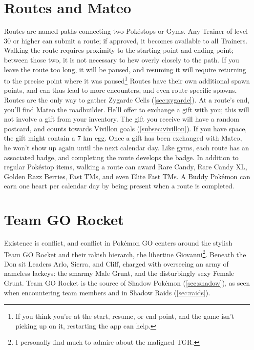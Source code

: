\section{Routes and Mateo\label{sec:routes}}
Routes are named paths connecting two Pokéstops or Gyms.
Any Trainer of level 30 or higher can submit a route; if approved, it becomes available to all Trainers.
Walking the route requires proximity to the starting point and ending point; between those two,
 it is not necessary to hew overly closely to the path.
If you leave the route too long, it will be paused, and resuming it will require returning to the precise
 point where it was paused\footnote{If you think you're at the start, resume, or end point, and the game isn't picking
 up on it, restarting the app can help.}
Routes have their own additional spawn points, and can thus lead to more encounters, and even route-specific spawns.
Routes are the only way to gather Zygarde Cells (\autoref{sec:zygarde}).
At a route's end, you'll find Mateo the roadbuilder.
He'll offer to exchange a gift with you; this will not involve a gift from your inventory.
The gift you receive will have a random postcard, and counts towards Vivillon goals (\autoref{subsec:vivillon}).
If you have space, the gift might contain a 7 km egg.
Once a gift has been exchanged with Mateo, he won't show up again until the next calendar day.
Like gyms, each route has an associated badge, and completing the route develops the badge.
In addition to regular Pokéstop items, walking a route can award Rare Candy, Rare Candy XL,
 Golden Razz Berries, Fast TMs, and even Elite Fast TMs.
A Buddy Pokémon can earn one heart per calendar day by being present when a route is completed.

\section{Team GO Rocket\label{sec:gorocket}}
Existence is conflict, and conflict in Pokémon GO centers around the stylish Team GO Rocket
 and their rakish hierarch, the libertine Giovanni\footnote{I personally find much to admire about the maligned TGR.}.
Beneath the Don sit Leaders Arlo, Sierra, and Cliff, charged with overseeing an army
 of nameless lackeys: the smarmy Male Grunt, and the disturbingly sexy Female Grunt.
Team GO Rocket is the source of Shadow Pokémon (\autoref{sec:shadow}),
 as seen when encountering team members and in Shadow Raids (\autoref{sec:raids}).


